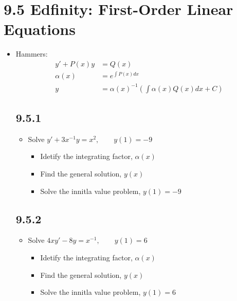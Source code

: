 
\section{9.5 Edfinity: First-Order Linear Equations}
\begin{itemize}
  \item Hammers:
    \begin{align*}
      y' + P(x)y &= Q(x)  \\
      \alpha(x) &= e^{\int P(x)dx} \\
      y &= \alpha(x)^{-1}\left(\int \alpha(x)Q(x)dx + C\right)
    \end{align*}

  \subsection{9.5.1}
  \begin{itemize}
    \item Solve \(y' + 3x^{-1}y = x^2, \qquad y(1) = -9\)
      \begin{itemize}
        \item Idetify the integrating factor, \(\alpha(x)\)

        \item Find the general solution, \(y(x)\)

        \item Solve the innitla value problem, \(y(1) = - 9\)
      \end{itemize}
  \end{itemize}

  \subsection{9.5.2}
  \begin{itemize}
    \item Solve \(4xy' - 8y = x^{-1}, \qquad y(1) = 6\)
      \begin{itemize}
        \item Idetify the integrating factor, \(\alpha(x)\)

        \item Find the general solution, \(y(x)\)

        \item Solve the innitla value problem, \(y(1) = 6\)
      \end{itemize}
  \end{itemize}


\end{itemize}
